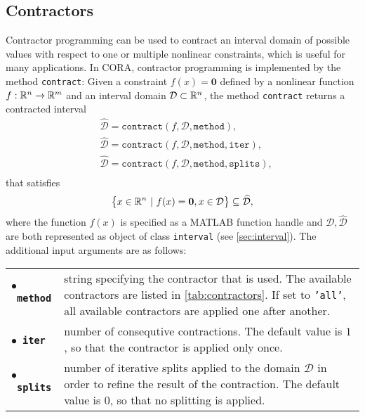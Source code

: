 \subsection{Contractors}
\label{sec:contractors}

Contractor programming \cite[Chapter~4]{Jaulin2006} can be used to contract an interval domain of possible values with respect to one or multiple nonlinear constraints, which is useful for many applications. In CORA, contractor programming is implemented by the method \texttt{contract}: Given a constraint $f(x) = \mathbf{0}$ defined by a nonlinear function $f: \mathbb{R}^n \to \mathbb{R}^m$ and an interval domain $\mathcal{D} \subset \mathbb{R}^n$, the method \texttt{contract} returns a contracted interval
\begin{equation*}
	\begin{split}
		& \widehat{\mathcal{D}} = \texttt{contract}(f,\mathcal{D},\texttt{method}), \\
		& \widehat{\mathcal{D}} = \texttt{contract}(f,\mathcal{D},\texttt{method},\texttt{iter}), \\
		& \widehat{\mathcal{D}} = \texttt{contract}(f,\mathcal{D},\texttt{method},\texttt{splits}), \\
	\end{split}
\end{equation*}
that satisfies
\begin{equation*}
	\big \{x \in \mathbb{R}^n~|~f(x) = \mathbf{0}, x \in \mathcal{D} \big \} \subseteq \widehat{\mathcal{D}},
\end{equation*}
where the function $f(x)$ is specified as a MATLAB function handle and $\mathcal{D},\widehat{\mathcal{D}}$ are both represented as object of class \texttt{interval} (see \cref{sec:interval}). The additional input arguments are as follows:

\begin{center}
\renewcommand{\arraystretch}{1.3}
\begin{tabular}[t]{l p{13cm} }
	$\bullet$~\textbf{\texttt{method}} & string specifying the contractor that is used. The available contractors are listed in \cref{tab:contractors}. If set to \texttt{'all'}, all available contractors are applied one after another. \\
	$\bullet$~\textbf{\texttt{iter}} & number of consequtive contractions. The default value is $1$, so that the contractor is applied only once.\\
	$\bullet$~\textbf{\texttt{splits}} & number of iterative splits applied to the domain $\mathcal{D}$ in order to refine the result of the contraction. The default value is $0$, so that no splitting is applied.
\end{tabular}
\end{center}

